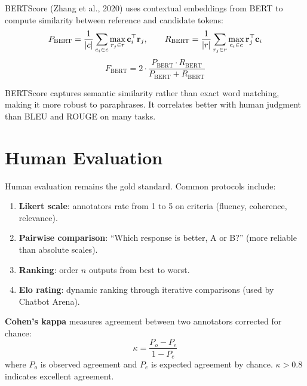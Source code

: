 \begin{definition}[BERTScore]
BERTScore (Zhang et al., 2020) uses contextual embeddings from BERT
to compute similarity between reference and candidate tokens:
\[
    P_{\text{BERT}} = \frac{1}{\left| c \right|} \sum_{c_i \in c}
    \max_{r_j \in r} \mathbf{c}_i^\top \mathbf{r}_j,
    \qquad
    R_{\text{BERT}} = \frac{1}{\left| r \right|} \sum_{r_j \in r}
    \max_{c_i \in c} \mathbf{r}_j^\top \mathbf{c}_i
\]
\[
    F_{\text{BERT}} = 2 \cdot \frac{P_{\text{BERT}} \cdot R_{\text{BERT}}}
    {P_{\text{BERT}} + R_{\text{BERT}}}
\]
\end{definition}

\begin{remark}
BERTScore captures semantic similarity rather than exact word matching,
making it more robust to paraphrases. It correlates better with human
judgment than BLEU and ROUGE on many tasks.
\end{remark}

\section{Human Evaluation}
\label{sec:eval:human}

\begin{definition}
Human evaluation remains the gold standard. Common protocols include:
\begin{enumerate}
    \item \textbf{Likert scale}: annotators rate from 1 to 5 on criteria
    (fluency, coherence, relevance).
    \item \textbf{Pairwise comparison}: ``Which response is better,
    A or B?'' (more reliable than absolute scales).
    \item \textbf{Ranking}: order $n$ outputs from best to worst.
    \item \textbf{Elo rating}: dynamic ranking through iterative
    comparisons (used by Chatbot Arena).
\end{enumerate}
\end{definition}

\begin{definition}
\textbf{Cohen's kappa} measures agreement between two annotators
corrected for chance:
\[
    \kappa = \frac{P_o - P_e}{1 - P_e}
\]
where $P_o$ is observed agreement and $P_e$ is expected agreement by
chance. $\kappa > 0.8$ indicates excellent agreement.
\end{definition}

